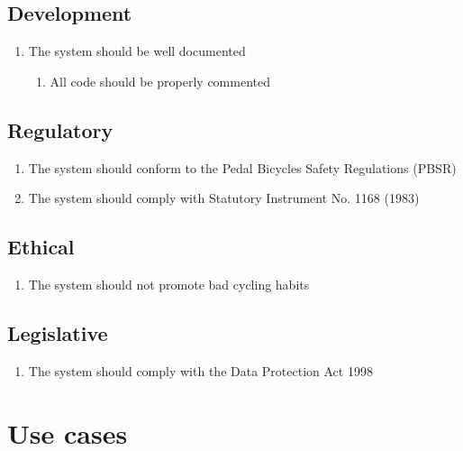 \documentclass[a4paper]{report}
\begin{document}
\subsection{Development}
\label{development}
\begin{enumerate}[label=\ref*{development}.\arabic*.,leftmargin=*]
\item The system should be well documented
\begin{enumerate}[label*=\arabic*.]
\item All code should be properly commented
\end{enumerate}
\end{enumerate}
\subsection{Regulatory}
\label{regulatory}
\begin{enumerate}[label=\ref*{regulatory}.\arabic*.,leftmargin=*]
\item The system should conform to the Pedal Bicycles Safety Regulations (PBSR)
\item The system should comply with Statutory Instrument No. 1168 (1983)
\end{enumerate}
\subsection{Ethical}
\label{ethical}
\begin{enumerate}[label=\ref*{ethical}.\arabic*.,leftmargin=*]
\item The system should not promote bad cycling habits
\end{enumerate}
\subsection{Legislative}
\label{legislative}
\begin{enumerate}[label=\ref*{legislative}.\arabic*.,leftmargin=*]
\item The system should comply with the Data Protection Act 1998
\end{enumerate}

\section{Use cases}
\label{sec:use-cases}
\end{document}
